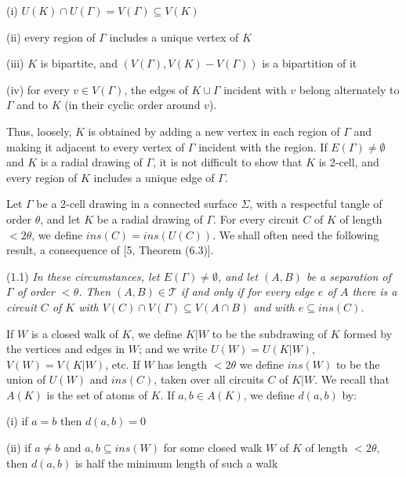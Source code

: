\hspace*{12pt}(i) $U(K) \cap U(\Gamma) = V(\Gamma) \subseteq V(K)$

\hspace*{12pt}(ii) every region of $\Gamma$ includes a unique vertex of $K$

\hspace*{12pt}(iii) $K$ is bipartite, and $(V(\Gamma), V(K) - V(\Gamma))$ is a bipartition of it

\hspace*{12pt}(iv) for every $v \in V(\Gamma)$, the edges of $K \cup \Gamma$ incident with $v$ belong alternately to $\Gamma$ and to $K$ (in their cyclic order around $v$).

Thus, loosely, $K$ is obtained by adding a new vertex in each region of $\Gamma$ and making it adjacent to every vertex of $\Gamma$ incident with the region. If $E(\Gamma) \ne \emptyset$ and $K$ is a radial drawing of $\Gamma$, it is not difficult to show that $K$ is 2-cell, and every region of $K$ includes a unique edge of $\Gamma$.

Let $\Gamma$ be a 2-cell drawing in a connected surface $\Sigma$, with a respectful tangle of order $\theta$, and let $K$ be a radial drawing of $\Gamma$. For every circuit $C$ of $K$ of length $<2\theta$, we define $ins(C) = ins(U(C))$. We shall often need the following result, a consequence of [5, Theorem (6.3)].

\stmt
(1.1) \textit{In these circumstances, let $E(\Gamma) \ne \emptyset$, and let $(A, B)$ be a separation of $\Gamma$ of order $<\theta$. Then $(A, B) \in \mathscr{T}$ if and only if for every edge $e$ of $A$ there is a circuit $C$ of $K$ with $V(C) \cap V(\Gamma) \subseteq V(A \cap B)$ and with $e \subseteq ins(C)$.}

If $W$ is a closed walk of $K$, we define $K | W$ to be the subdrawing of $K$ formed by the vertices and edges in $W$; and we write $U(W) = U(K | W)$, $V(W) = V(K | W)$, etc. If $W$ has length $<2\theta$ we define $ins(W)$ to be the union of $U(W)$ and $ins(C)$, taken over all circuits $C$ of $K | W$. We recall that $A(K)$ is the set of atoms of $K$. If $a, b \in A(K)$, we define $d(a, b)$ by:

\hspace*{12pt}(i) if $a = b$ then $d(a, b) = 0$

\hspace*{12pt}(ii) if $a \ne b$ and $a, b \subseteq ins(W)$ for some closed walk $W$ of $K$ of length $<2\theta$, then $d(a, b)$ is half the minimum length of such a walk

